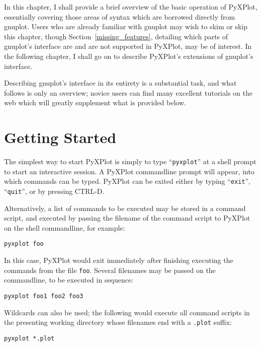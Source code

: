 \documentclass[a4paper,onecolumn,11pt]{book}
\begin{document}
In this chapter, I shall provide a brief overview of the basic operation of
PyXPlot, essentially covering those areas of syntax which are borrowed directly
from gnuplot. Users who are already familiar with gnuplot may wish to skim or
skip this chapter, though Section~\ref{missing_features}, detailing which
parts of gnuplot's interface are and are not supported in PyXPlot, may be of
interest. In the following chapter, I shall go on to describe PyXPlot's
extensions of gnuplot's interface.

Describing gnuplot's interface in its entirety is a substantial task, and what
follows is only an overview; novice users can find many excellent tutorials on
the web which will greatly supplement what is provided below.

\section{Getting Started}

The simplest way to start PyXPlot is simply to type ``\texttt{pyxplot}'' at a
shell prompt to start an interactive session. A PyXPlot commandline prompt will
appear, into which commands can be typed. PyXPlot can be exited either by
typing ``\texttt{exit}'', ``\texttt{quit}'', or by pressing CTRL-D.

Alternatively, a list of commands to be executed may be stored in a command
script, and executed by passing the filename of the command script to PyXPlot
on the shell commandline, for example:

\begin{verbatim}
pyxplot foo
\end{verbatim}

\noindent In this case, PyXPlot would exit immediately after finishing
executing the commands from the file \texttt{foo}. Several filenames may be
passed on the commandline, to be executed in sequence:

\begin{verbatim}
pyxplot foo1 foo2 foo3
\end{verbatim}

\noindent Wildcards can also be used; the following would execute all command
scripts in the presenting working directory whose filenames end with a
\texttt{.plot} suffix:

\begin{verbatim}
pyxplot *.plot
\end{verbatim}
\end{document}
